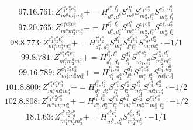 \documentclass[letterpaper,10pt,fleqn,leqno,onecolumn]{article}
\begin{document}
\begin{equation} \;\;\;\;\;\;  97.16.761: Z^{e_{1}^{a}e_{2}^{a}e_{3}^{a}}_{m_{1}^{a}m_{2}^{a}m_{3}^{a}}+=H^{l_{1}^{a},l_{1}^{b}}_{d_{1}^{a},d_{1}^{b}}S^{d_{1}^{a}}_{m_{1}^{a}}S^{e_{1}^{a}e_{2}^{a}}_{m_{2}^{a},l_{1}^{a}}S^{e_{3}^{a},d_{1}^{b}}_{m_{3}^{a},l_{1}^{b}} \end{equation}
\begin{equation} \;\;\;\;\;\;  97.20.765: Z^{e_{1}^{a}e_{2}^{a}e_{3}^{a}}_{m_{1}^{a}m_{2}^{a}m_{3}^{a}}+=H^{l_{1}^{a},l_{2}^{a}}_{d_{1}^{a},d_{2}^{a}}S^{d_{1}^{a}}_{m_{1}^{a}}S^{e_{1}^{a}e_{2}^{a}}_{m_{2}^{a},l_{1}^{a}}S^{e_{3}^{a},d_{2}^{a}}_{m_{3}^{a},l_{2}^{a}} \end{equation}
\begin{equation} \;\;\;\;\;\;  98.8.773: Z^{e_{1}^{a}e_{2}^{a}e_{3}^{a}}_{m_{1}^{a}m_{2}^{a}m_{3}^{a}}+=H^{l_{1}^{a}l_{2}^{a}}_{d_{1}^{a},d_{2}^{a}}S^{d_{1}^{a}}_{m_{1}^{a}}S^{e_{1}^{a}e_{2}^{a}}_{l_{1}^{a}l_{2}^{a}}S^{e_{3}^{a},d_{2}^{a}}_{m_{2}^{a}m_{3}^{a}}\cdot -1/1 \end{equation}
\begin{equation} \;\;\;\;\;\;  99.8.781: Z^{e_{1}^{a}e_{2}^{a}e_{3}^{a}}_{m_{1}^{a}m_{2}^{a}m_{3}^{a}}+=H^{l_{1}^{b},l_{1}^{a}}_{d_{1}^{b},d_{1}^{a}}S^{d_{1}^{b}}_{l_{1}^{b}}S^{e_{1}^{a}e_{2}^{a}}_{m_{1}^{a},l_{1}^{a}}S^{e_{3}^{a},d_{1}^{a}}_{m_{2}^{a}m_{3}^{a}} \end{equation}
\begin{equation} \;\;\;\;\;\;  99.16.789: Z^{e_{1}^{a}e_{2}^{a}e_{3}^{a}}_{m_{1}^{a}m_{2}^{a}m_{3}^{a}}+=H^{l_{1}^{a},l_{2}^{a}}_{d_{1}^{a},d_{2}^{a}}S^{d_{1}^{a}}_{l_{1}^{a}}S^{e_{1}^{a}e_{2}^{a}}_{m_{1}^{a},l_{2}^{a}}S^{e_{3}^{a},d_{2}^{a}}_{m_{2}^{a}m_{3}^{a}} \end{equation}
\begin{equation} \;\;\;\;\;\;  101.8.800: Z^{e_{1}^{a}e_{2}^{a}e_{3}^{a}}_{m_{1}^{a}m_{2}^{a}m_{3}^{a}}+=H^{l_{1}^{a},l_{2}^{a}}_{d_{1}^{a},d_{2}^{a}}S^{e_{1}^{a}}_{l_{1}^{a}}S^{e_{2}^{a}}_{l_{2}^{a}}S^{d_{1}^{a}}_{m_{1}^{a}}S^{e_{3}^{a},d_{2}^{a}}_{m_{2}^{a}m_{3}^{a}}\cdot -1/2 \end{equation}
\begin{equation} \;\;\;\;\;\;  102.8.808: Z^{e_{1}^{a}e_{2}^{a}e_{3}^{a}}_{m_{1}^{a}m_{2}^{a}m_{3}^{a}}+=H^{l_{1}^{a},l_{2}^{a}}_{d_{1}^{a},d_{2}^{a}}S^{e_{1}^{a}}_{l_{1}^{a}}S^{d_{1}^{a}}_{m_{1}^{a}}S^{d_{2}^{a}}_{m_{2}^{a}}S^{e_{2}^{a}e_{3}^{a}}_{m_{3}^{a},l_{2}^{a}}\cdot -1/2 \end{equation}
\begin{equation} \;\;\;\;\;\;  18.1.63: Z^{e_{1}^{b}e_{2}^{b}e_{3}^{b}}_{m_{1}^{b}m_{2}^{b}m_{3}^{b}}+=H^{e_{1}^{b}e_{2}^{b}}_{m_{1}^{b},d_{1}^{b}}S^{e_{3}^{b},d_{1}^{b}}_{m_{2}^{b}m_{3}^{b}}\cdot -1/1 \end{equation}
\end{document}
